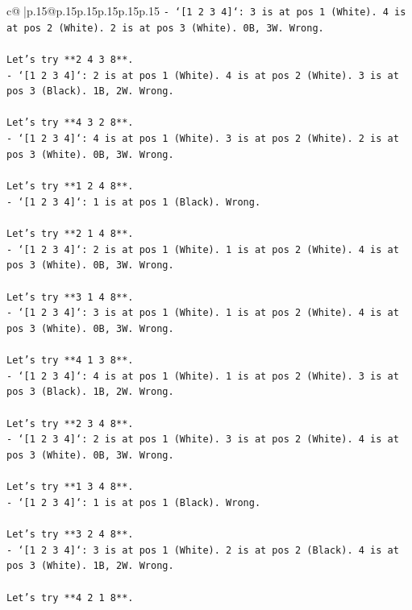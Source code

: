 \documentclass{article}
\begin{document}
{\begin{supertabular}{c@{$\;$}|p{.15\linewidth}@{}p{.15\linewidth}p{.15\linewidth}p{.15\linewidth}p{.15\linewidth}p{.15\linewidth}}
{{{\texttt{{-} `{[}1 2 3 4{]}`: 3 is at pos 1 (White). 4 is at pos 2 (White). 2 is at pos 3 (White). 0B, 3W. Wrong.} \\
\\ 
\texttt{Let's try **2 4 3 8**.} \\
\texttt{{-} `{[}1 2 3 4{]}`: 2 is at pos 1 (White). 4 is at pos 2 (White). 3 is at pos 3 (Black). 1B, 2W. Wrong.} \\
\\ 
\texttt{Let's try **4 3 2 8**.} \\
\texttt{{-} `{[}1 2 3 4{]}`: 4 is at pos 1 (White). 3 is at pos 2 (White). 2 is at pos 3 (White). 0B, 3W. Wrong.} \\
\\ 
\texttt{Let's try **1 2 4 8**.} \\
\texttt{{-} `{[}1 2 3 4{]}`: 1 is at pos 1 (Black). Wrong.} \\
\\ 
\texttt{Let's try **2 1 4 8**.} \\
\texttt{{-} `{[}1 2 3 4{]}`: 2 is at pos 1 (White). 1 is at pos 2 (White). 4 is at pos 3 (White). 0B, 3W. Wrong.} \\
\\ 
\texttt{Let's try **3 1 4 8**.} \\
\texttt{{-} `{[}1 2 3 4{]}`: 3 is at pos 1 (White). 1 is at pos 2 (White). 4 is at pos 3 (White). 0B, 3W. Wrong.} \\
\\ 
\texttt{Let's try **4 1 3 8**.} \\
\texttt{{-} `{[}1 2 3 4{]}`: 4 is at pos 1 (White). 1 is at pos 2 (White). 3 is at pos 3 (Black). 1B, 2W. Wrong.} \\
\\ 
\texttt{Let's try **2 3 4 8**.} \\
\texttt{{-} `{[}1 2 3 4{]}`: 2 is at pos 1 (White). 3 is at pos 2 (White). 4 is at pos 3 (White). 0B, 3W. Wrong.} \\
\\ 
\texttt{Let's try **1 3 4 8**.} \\
\texttt{{-} `{[}1 2 3 4{]}`: 1 is at pos 1 (Black). Wrong.} \\
\\ 
\texttt{Let's try **3 2 4 8**.} \\
\texttt{{-} `{[}1 2 3 4{]}`: 3 is at pos 1 (White). 2 is at pos 2 (Black). 4 is at pos 3 (White). 1B, 2W. Wrong.} \\
\\ 
\texttt{Let's try **4 2 1 8**.} \\
}}}
\end{supertabular}}
\end{document}

